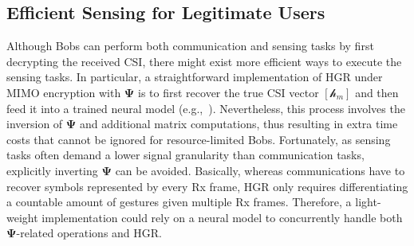 \documentclass[conference,compsoc]{IEEEtran}
\begin{document}
\subsection{Efficient Sensing for Legitimate Users} \label{ssec:effsense}
\vspace{-1.5ex}
%
Although Bobs can perform both communication and sensing tasks by first decrypting the received CSI, there might exist more efficient ways to execute the sensing tasks. In particular, a straightforward implementation of HGR under MIMO encryption with $\bm{\Psi}$ is to first recover the true CSI vector $[\mathcal{h}_{m}]$ and then feed it into a trained neural model (e.g.,~\cite{Widar3-MobiSys19,RFNet-SenSys20}). 
Nevertheless, this process involves the inversion of $\bm{\Psi}$ and additional matrix computations, thus resulting in extra time costs that cannot be ignored for resource-limited Bobs. 
Fortunately, as sensing tasks often demand a lower signal granularity than communication tasks, explicitly inverting $\bm{\Psi}$ can be avoided. Basically, whereas communications have to recover symbols represented by every Rx frame,
HGR only requires differentiating a countable amount of gestures given multiple Rx frames. 
Therefore, a light-weight implementation could rely on a neural model to concurrently handle both $\bm{\Psi}$-related operations and HGR.
\end{document}
